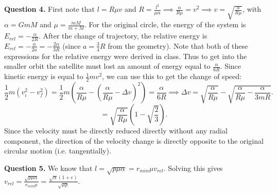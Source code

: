 \documentclass[letterpaper, reqno,11pt]{article}
\begin{document}
{\noindent\bf Question 4.} First note that $l=R\mu v$ and $R=\frac{l^2}{\mu\alpha}\implies \frac{\alpha}{R\mu}=v^{2}\implies v=\sqrt{\frac{\alpha}{R\mu}} $, with $\alpha=GmM$ and $\mu=\frac{mM}{m+M}$. For the original circle, the energy of the system is $E_{rel}=-\frac{\alpha}{2R}$. After the change of trajectory, the relative energy is $E_{rel}=-\frac{\alpha}{2a}=-\frac{2\alpha}{3R}$ (since $a=\frac{3}{4}R$ from the geometry). Note that both of these expressions for the relative energy were derived in class. Thus to get into the smaller orbit the satellite must lost an amount of energy equal to $\frac{\alpha}{6R}$. Since kinetic energy is equal to $\frac{1}{2}m v^2$, we can use this to get the change of speed: 
\[
\frac{1}{2}m (v_i^2-v_f^2)=\frac{1}{2}m(\frac{\alpha}{R\mu}-\left( \frac{\alpha}{R\mu}-\Delta v \right) ^2)=\frac{\alpha}{6R}\implies \Delta v=\sqrt{\frac{\alpha}{R\mu}}-\sqrt{\frac{\alpha}{R\mu}-\frac{\alpha}{3mR}} 
.\]
\[
=\sqrt{\frac{\alpha}{R\mu}}\left( 1-\sqrt{\frac{2}{3}}  \right)
.\]
Since the velocity must be directly reduced directly without any radial component, the direction of the velocity change is directly opposite to the original circular motion (i.e. tangentially). 



{\noindent\bf Question 5.} We know that $l=\sqrt{p\mu\alpha}=r_{min}\mu v_{rel}$. Solving this gives $v_{rel}=\frac{\sqrt{p\mu\alpha} }{r_{min}\mu}=\frac{\sqrt{\alpha}(1+e)}{\sqrt{\mu p}}$. 
\end{document}
